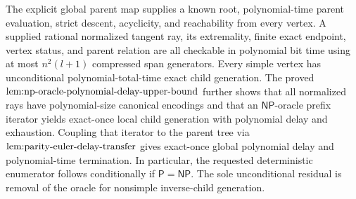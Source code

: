 The explicit global parent map supplies a known root, polynomial-time parent evaluation, strict descent, acyclicity, and reachability from every vertex. A supplied rational normalized tangent ray, its extremality, finite exact endpoint, vertex status, and parent relation are all checkable in polynomial bit time using at most \(n^2(l+1)\) compressed span generators. Every simple vertex has unconditional polynomial-total-time exact child generation. The proved \(\textup{lem:np-oracle-polynomial-delay-upper-bound}\) further shows that all normalized rays have polynomial-size canonical encodings and that an \(\mathsf{NP}\)-oracle prefix iterator yields exact-once local child generation with polynomial delay and exhaustion. Coupling that iterator to the parent tree via \(\textup{lem:parity-euler-delay-transfer}\) gives exact-once global polynomial delay and polynomial-time termination. In particular, the requested deterministic enumerator follows conditionally if \(\mathsf P=\mathsf{NP}\). The sole unconditional residual is removal of the oracle for nonsimple inverse-child generation.